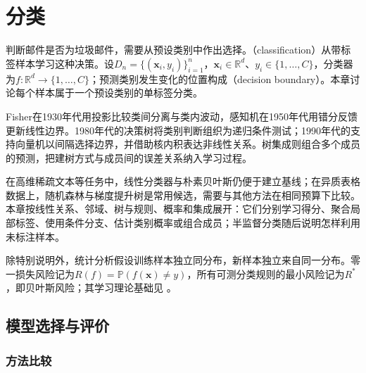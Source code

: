 \chapter{分类}
\label{chap:classification}

判断邮件是否为垃圾邮件，需要从预设类别中作出选择。（classification）从带标签样本学习这种决策。设$D_n=\{(\bm{x}_i,y_i)\}_{i=1}^{n}$，$\bm{x}_i\in\mathbb{R}^{d}$、$y_i\in\{1,\dots,C\}$，分类器为$f:\mathbb{R}^{d}\to\{1,\dots,C\}$；预测类别发生变化的位置构成（decision boundary）。本章讨论每个样本属于一个预设类别的单标签分类。

Fisher在1930年代用投影比较类间分离与类内波动，感知机在1950年代用错分反馈更新线性边界。1980年代的决策树将类别判断组织为递归条件测试；1990年代的支持向量机以间隔选择边界，并借助核内积表达非线性关系。树集成则组合多个成员的预测，把建树方式与成员间的误差关系纳入学习过程。

在高维稀疏文本等任务中，线性分类器与朴素贝叶斯仍便于建立基线；在异质表格数据上，随机森林与梯度提升树是常用候选，需要与其他方法在相同预算下比较。本章按线性关系、邻域、树与规则、概率和集成展开：它们分别学习得分、聚合局部标签、使用条件分支、估计类别概率或组合成员；半监督分类随后说明怎样利用未标注样本。

除特别说明外，统计分析假设训练样本独立同分布，新样本独立来自同一分布。零一损失风险记为$R(f)=\mathbb{P}(f(\bm{x})\ne y)$，所有可测分类规则的最小风险记为$R^\ast$，即贝叶斯风险；其学习理论基础见
。









\section{模型选择与评价}
\label{sec:classification-evaluation}

\subsection{方法比较}

